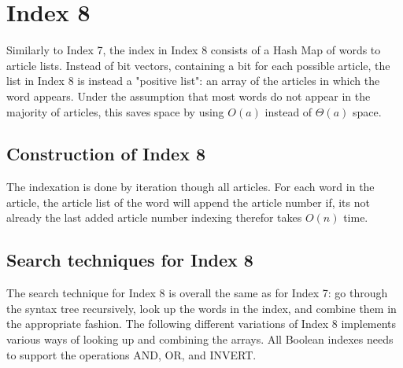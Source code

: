 \section{Index 8}
Similarly to Index 7, the index in Index 8 consists of a Hash Map of words to article lists. Instead of bit vectors, containing a bit for each possible article, the list in Index 8 is instead a "positive list": an array of the articles in which the word appears. Under the assumption that most words do not appear in the majority of articles, this saves space by using $O(a)$ instead of $\Theta(a)$ space. 


\subsection{Construction of Index 8}
The indexation is done by iteration though all articles. For each word in the article, the article list of the word will append the article number if, its not already the last added article number indexing therefor takes $O(n)$ time.

\subsection{Search techniques for Index 8}

The search technique for Index 8 is overall the same as for Index 7: go through the syntax tree recursively, look up the words in the index, and combine them in the appropriate fashion. The following different variations of Index 8 implements various ways of looking up and combining the arrays. All Boolean indexes needs to support the operations AND, OR, and INVERT. 

